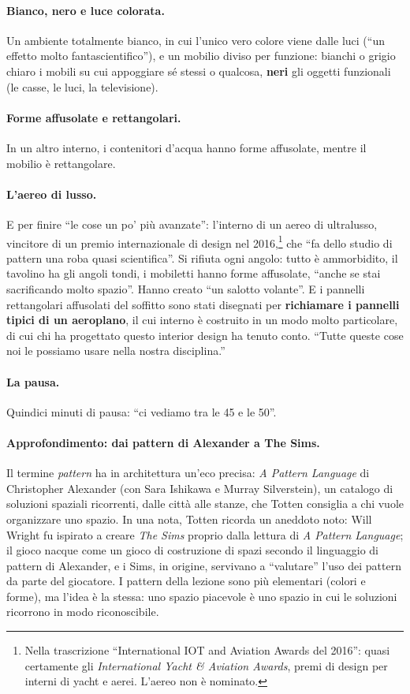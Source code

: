 \paragraph{Bianco, nero e luce colorata.} Un ambiente totalmente bianco, in cui l'unico
vero colore viene dalle luci (``un effetto molto fantascientifico''), e un mobilio diviso
per funzione: bianchi o grigio chiaro i mobili su cui appoggiare sé stessi o qualcosa,
\textbf{neri} gli oggetti funzionali (le casse, le luci, la televisione).

\paragraph{Forme affusolate e rettangolari.} In un altro interno, i contenitori d'acqua
hanno forme affusolate, mentre il mobilio è rettangolare.

\paragraph{L'aereo di lusso.} E per finire ``le cose un po' più avanzate'': l'interno di
un aereo di ultralusso, vincitore di un premio internazionale di design nel
2016,\footnote{Nella trascrizione ``International IOT and Aviation Awards del 2016'':
quasi certamente gli \emph{International Yacht \& Aviation Awards}, premi di design per
interni di yacht e aerei. L'aereo non è nominato.} che ``fa dello studio di pattern una
roba quasi scientifica''. Si rifiuta ogni angolo: tutto è ammorbidito, il tavolino ha gli
angoli tondi, i mobiletti hanno forme affusolate, ``anche se stai sacrificando molto
spazio''. Hanno creato ``un salotto volante''. E i pannelli rettangolari affusolati del
soffitto sono stati disegnati per \textbf{richiamare i pannelli tipici di un aeroplano},
il cui interno è costruito in un modo molto particolare, di cui chi ha progettato questo
interior design ha tenuto conto. ``Tutte queste cose noi le possiamo usare nella nostra
disciplina.''

\paragraph{La pausa.} Quindici minuti di pausa: ``ci vediamo tra le 45 e le 50''.

\paragraph{Approfondimento: dai pattern di Alexander a The Sims.} Il termine
\emph{pattern} ha in architettura un'eco precisa: \emph{A Pattern Language} di
Christopher Alexander (con Sara Ishikawa e Murray Silverstein), un catalogo di soluzioni
spaziali ricorrenti, dalle città alle stanze, che Totten consiglia a chi vuole
organizzare uno spazio. In una nota, Totten ricorda un aneddoto noto: Will Wright fu
ispirato a creare \emph{The Sims} proprio dalla lettura di \emph{A Pattern Language};
il gioco nacque come un gioco di costruzione di spazi secondo il linguaggio di pattern di
Alexander, e i Sims, in origine, servivano a ``valutare'' l'uso dei pattern da parte del
giocatore. I pattern della lezione sono più elementari (colori e forme), ma l'idea è la
stessa: uno spazio piacevole è uno spazio in cui le soluzioni ricorrono in modo
riconoscibile.

